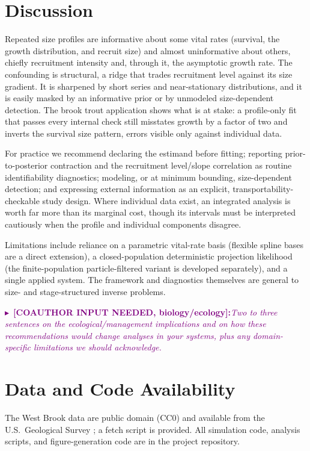 \documentclass[11pt]{article}
\newcommand{\needbio}[1]{%
  \par\smallskip\noindent%
  \textcolor{purple}{$\blacktriangleright$~\textbf{[COAUTHOR INPUT NEEDED, biology/ecology]:}\space\textit{#1}}%
  \par\smallskip}
\begin{document}
\section{Discussion}
\label{sec:discussion}

Repeated size profiles are informative about some vital rates (survival, the
growth distribution, and recruit size) and almost uninformative about others,
chiefly recruitment intensity and, through it, the asymptotic growth rate. The
confounding is structural, a ridge that trades recruitment level against its size
gradient. It is sharpened by short series and near-stationary distributions, and
it is easily masked by an informative prior or by unmodeled size-dependent
detection. The brook trout application shows what is at stake: a profile-only fit
that passes every internal check still misstates growth by a factor of two and
inverts the survival size pattern, errors visible only against individual data.

For practice we recommend declaring the estimand before fitting; reporting
prior-to-posterior contraction and the recruitment level/slope correlation as
routine identifiability diagnostics; modeling, or at minimum bounding,
size-dependent detection; and expressing external information as an explicit,
transportability-checkable study design. Where individual data exist, an
integrated analysis is worth far more than its marginal cost, though its intervals
must be interpreted cautiously when the profile and individual components
disagree.

Limitations include reliance on a parametric vital-rate basis (flexible spline
bases are a direct extension), a closed-population deterministic projection
likelihood (the finite-population particle-filtered variant is developed
separately), and a single applied system. The framework and diagnostics
themselves are general to size- and stage-structured inverse problems.

\needbio{Two to three sentences on the ecological/management implications and on
how these recommendations would change analyses in your systems, plus any
domain-specific limitations we should acknowledge.}

\section*{Data and Code Availability}
The West Brook data are public domain (CC0) and available from the U.S.\
Geological Survey \citep{westbrookdata}; a fetch script is provided. All
simulation code, analysis scripts, and figure-generation code are in the project
repository.
\end{document}
